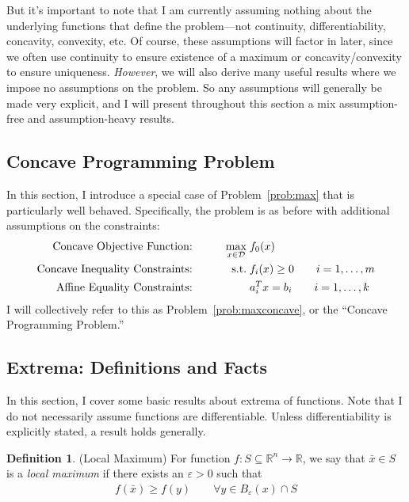 \documentclass[12pt]{article}
\numberwithin{equation}{section} %
\theoremstyle{plain}
\theoremstyle{definition}
\newtheorem{defn}[thm]{Definition}
\theoremstyle{remark}
\newcommand{\R}{\mathbb{R}}
\newcommand{\Rn}{\mathbb{R}^n}
\begin{document}
But it's important to note that I am currently assuming nothing about
the underlying functions that define the problem---not continuity,
differentiability, concavity, convexity, etc. Of course, these
assumptions will factor in later, since we often use continuity to
ensure existence of a maximum or concavity/convexity to ensure
uniqueness. \emph{However}, we will also derive many useful results
where we impose no assumptions on the problem. So any assumptions will
generally be made very explicit, and I will present throughout this
section a mix assumption-free and assumption-heavy results.

\subsection{Concave Programming Problem}

In this section, I introduce a special case of Problem~\ref{prob:max}
that is particularly well behaved. Specifically, the problem is as
before with additional assumptions on the constraints:
\begin{alignat}{3}
  \text{Concave Objective Function:} \qquad
    && \max_{x\in\mathcal{D}} \; &f_0(x) \label{prob:maxconcave}\\
  \text{Concave Inequality Constraints:} \qquad
    && \text{s.t.} \; &f_i(x) \geq 0 \qquad i = 1,\ldots, m\notag \\
  \text{Affine Equality Constraints:} \qquad
    && &a_i^T x = b_i \qquad i = 1,\ldots,k\notag
\end{alignat}
I will collectively refer to this as Problem~\ref{prob:maxconcave}, or
the ``Concave Programming Problem.''

\subsection{Extrema: Definitions and Facts}
\label{sec:extrema}

In this section, I cover some basic results about extrema of functions.
Note that I do not necessarily assume functions are differentiable.
Unless differentiability is explicitly stated, a result holds generally.

\begin{defn}{(Local Maximum)}
For function $f:S\subseteq\Rn\rightarrow \R$, we say that $\bar{x} \in
S$ is a \emph{local maximum} if there exists an $\varepsilon>0$ such
that
\begin{align*}
  f(\bar{x})\geq f(y)
  \qquad \forall y \in B_\varepsilon(x) \cap S
\end{align*}
\end{defn}
\end{document}
